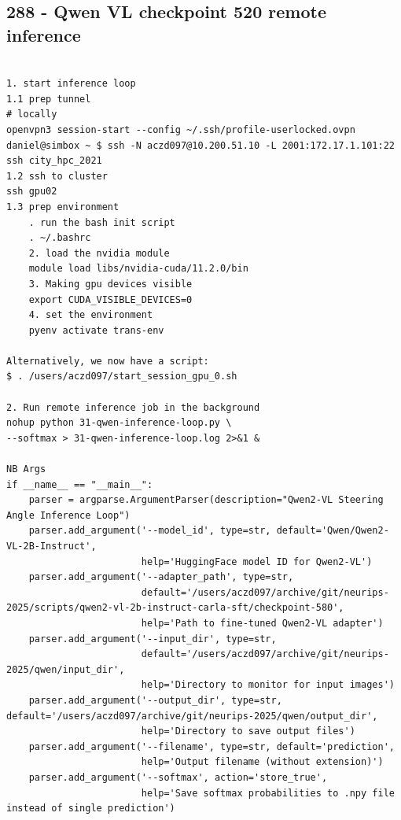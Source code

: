 \subsection{288 - Qwen VL checkpoint 520 remote inference}
\label{app_res:288}

\begin{verbatim}

1. start inference loop
1.1 prep tunnel
# locally
openvpn3 session-start --config ~/.ssh/profile-userlocked.ovpn
daniel@simbox ~ $ ssh -N aczd097@10.200.51.10 -L 2001:172.17.1.101:22
ssh city_hpc_2021
1.2 ssh to cluster
ssh gpu02
1.3 prep environment
    . run the bash init script
    . ~/.bashrc
    2. load the nvidia module
    module load libs/nvidia-cuda/11.2.0/bin
    3. Making gpu devices visible
    export CUDA_VISIBLE_DEVICES=0
    4. set the environment
    pyenv activate trans-env
    
Alternatively, we now have a script:
$ . /users/aczd097/start_session_gpu_0.sh

2. Run remote inference job in the background
nohup python 31-qwen-inference-loop.py \
--softmax > 31-qwen-inference-loop.log 2>&1 &

NB Args
if __name__ == "__main__":
    parser = argparse.ArgumentParser(description="Qwen2-VL Steering Angle Inference Loop")
    parser.add_argument('--model_id', type=str, default='Qwen/Qwen2-VL-2B-Instruct',
                        help='HuggingFace model ID for Qwen2-VL')
    parser.add_argument('--adapter_path', type=str,
                        default='/users/aczd097/archive/git/neurips-2025/scripts/qwen2-vl-2b-instruct-carla-sft/checkpoint-580',
                        help='Path to fine-tuned Qwen2-VL adapter')
    parser.add_argument('--input_dir', type=str,
                        default='/users/aczd097/archive/git/neurips-2025/qwen/input_dir',
                        help='Directory to monitor for input images')
    parser.add_argument('--output_dir', type=str, default='/users/aczd097/archive/git/neurips-2025/qwen/output_dir',
                        help='Directory to save output files')
    parser.add_argument('--filename', type=str, default='prediction',
                        help='Output filename (without extension)')
    parser.add_argument('--softmax', action='store_true',
                        help='Save softmax probabilities to .npy file instead of single prediction')



\end{verbatim}
